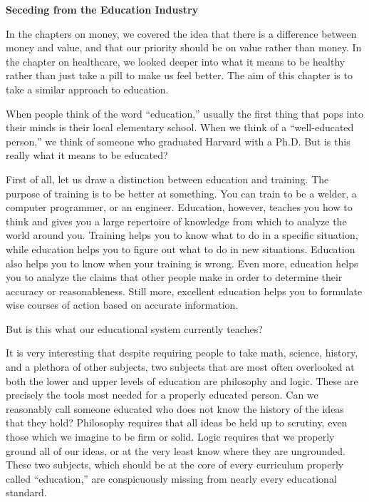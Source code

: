\documentclass[letterpaper]{article}
\title{}
\begin{document}
\clearpage\setcounter{page}{1}\pagestyle{Standard}
{\centering{}\bfseries\color{black}
Seceding from the Education Industry
\par}

{\color{black}
In the chapters on money, we covered the idea that there is a difference
between money and value, and that our priority should be on value
rather than money. In the chapter on healthcare, we looked deeper into
what it means to be healthy rather than just take a pill to make
\textcolor[rgb]{0.32941177,0.5529412,0.83137256}{us} feel better. The
aim of this chapter is to take a similar approach to education.}

{\color{black}
When people think of the word “education,” usually the first thing that
pops into their minds is their local elementary school. When we think
of a “well-educated person,” we think of someone who graduated Harvard
with a Ph.D. But is this really what it means to be educated?}

{\color{black}
First of all, let us draw a distinction between education and training.
The purpose of training is to be better at something. You can train to
be a welder, a computer programmer, or an engineer. Education, however,
teaches you how to think and gives you a large repertoire of knowledge
\textcolor[rgb]{0.32941177,0.5529412,0.83137256}{from} which to analyze
the world around you. Training helps you to know what to do in a
specific situation, while education helps you to figure out what to do
in new situations. Education also helps you to know when your training
is wrong. Even more, education helps you to analyze the claims that
other people make in order to determine their accuracy or
reasonableness. Still more, excellent education helps you to formulate
wise courses of action based on accurate information.}

{\color{black}
But is this what our educational system currently teaches?}

{\color{black}
It is very interesting that despite requiring people to take math,
science, history, and a plethora of other subjects, two subjects that
are most often overlooked at both the lower and upper levels of
education are philosophy and logic. These are precisely the tools most
needed for a properly educated person. Can we reasonably call someone
educated who does not know the history of the ideas that they hold? 
Philosophy requires that all ideas be held up to scrutiny, even those
which we imagine to be firm or solid. Logic requires that we properly
ground all of our ideas, or at the very least know where they are
ungrounded. These two subjects, which should be at the core of every
curriculum properly called “education,” are conspicuously missing from
nearly every educational standard.}
\end{document}
